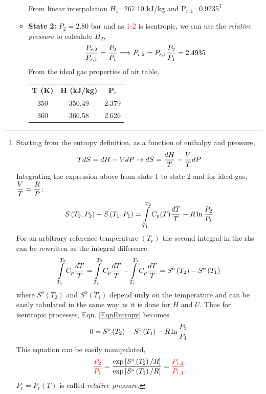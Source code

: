 \begin{enumerate}
\begin{itemize}
From linear interpolation $H_{1}$=267.10 kJ/kg and P$_{r,1}$=0.9235\footnote{Starting from the entropy definition, as a function of enthalpy and pressure, 
\begin{displaymath}
TdS=dH-VdP \rightarrow dS=\displaystyle\frac{dH}{T}-\displaystyle\frac{V}{T}dP
\end{displaymath}
Integrating the expression above from state 1 to state 2 and for ideal gas, $\displaystyle\frac{V}{T}=\displaystyle\frac{R}{P}$:
\begin{equation}
S\left(T_{2},P_{2}\right) - S\left(T_{1},P_{1}\right)=\int\limits_{T_{1}}^{T_{2}}C_{p}(T)\displaystyle\frac{dT}{T}-R\ln\displaystyle\frac{P_{2}}{P_{1}}\label{EqnEntropy}
\end{equation}
For an arbitrary reference temperature $\left(T_{r}\right)$ the second integral in the rhs can be rewritten as the integral difference:
\begin{displaymath}
\int\limits_{T_{1}}^{T_{2}}C_{p}\displaystyle\frac{dT}{T}=\int\limits_{T_{r}}^{T_{2}}C_{p}\displaystyle\frac{dT}{T} - \int\limits_{T_{r}}^{T_{1}}C_{p}\displaystyle\frac{dT}{T} = S^{\text{o}}\left(T_{2}\right)-S^{\text{o}}\left(T_{1}\right)
\end{displaymath}
where $S^{\text{o}}\left(T_{2}\right)$ and $S^{\text{o}}\left(T_{1}\right)$ depend {\bf only} on the temperature and can be easily tabulated in the same way as it is done for $H$ and $U$.  Thus for isentropic processes, Eqn. \ref{EqnEntropy} becomes
\begin{displaymath}
0 = S^{\text{o}}\left(T_{2}\right)-S^{\text{o}}\left(T_{1}\right) - R\ln\displaystyle\frac{P_{2}}{P_{1}}
\end{displaymath}
This equation can be easily manipulated,
\begin{displaymath}
\textcolor{red}{\displaystyle\frac{P_{2}}{P_{1}}} = \displaystyle\frac{\exp\left[S^{\text{o}}\left(T_{2}\right)/R\right]} {\exp\left[S^{\text{o}}\left(T_{1}\right)/R\right]} = \textcolor{red}{\displaystyle\frac{P_{r,2}}{P_{r,1}}}
\end{displaymath}
$P_{r}=P_{r}(T)$ is called {\it relative pressure}.}

\item {\bf State 2:} $P_{2}=2.80$ bar and as \textcolor{red}{1-2} is isentropic, we can use the {\it relative pressure} to calculate $H_{2}$,
\begin{displaymath}
\displaystyle\frac{P_{r,2}}{P_{r,1}} = \displaystyle\frac{P_{2}}{P_{1}} \Longrightarrow P_{r,2} = P_{r,1}\displaystyle\frac{P_{2}}{P_{1}} = 2.4935
\end{displaymath}
From the  ideal gas properties of air table,\\
\begin{tabular}{ c c c }
{\bf T (K)} & {\bf H (kJ/kg)}  & {\bf P$_{r}$} \\
  350       &   350.49         &    2.379  \\
  360       &   360.58         &    2.626  \\
\end{tabular}


\end{itemize}
\end{enumerate}
